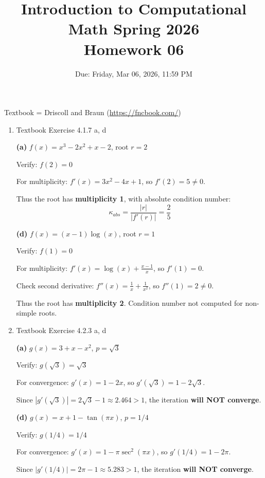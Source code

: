 \documentclass[reqno]{exam}
\title{Introduction to Computational Math Spring 2026 \\ Homework 06}
\date{Due: Friday, Mar 06, 2026, 11:59 PM}
\author{}
\begin{document}
\maketitle
\thispagestyle{empty}

Textbook = Driscoll and Braun (\url{https://fncbook.com/})

\begin{enumerate}

\item Textbook Exercise 4.1.7 a, d
\begin{solution}
\textbf{(a)} $f(x) = x^3 - 2x^2 + x - 2$, root $r = 2$

Verify: $f(2) = 0$ \checkmark

For multiplicity: $f'(x) = 3x^2 - 4x + 1$, so $f'(2) = 5 \neq 0$.

Thus the root has \textbf{multiplicity 1}, with absolute condition number:
$$\kappa_{abs} = \frac{|r|}{|f'(r)|} = \frac{2}{5}$$

\textbf{(d)} $f(x) = (x-1)\log(x)$, root $r = 1$

Verify: $f(1) = 0$ \checkmark

For multiplicity: $f'(x) = \log(x) + \frac{x-1}{x}$, so $f'(1) = 0$.

Check second derivative: $f''(x) = \frac{1}{x} + \frac{1}{x^2}$, so $f''(1) = 2 \neq 0$.

Thus the root has \textbf{multiplicity 2}. Condition number not computed for non-simple roots.
\end{solution}

\item Textbook Exercise 4.2.3 a, d
\begin{solution}
\textbf{(a)} $g(x) = 3 + x - x^2$, $p = \sqrt{3}$

Verify: $g(\sqrt{3}) = \sqrt{3}$ \checkmark

For convergence: $g'(x) = 1 - 2x$, so $g'(\sqrt{3}) = 1 - 2\sqrt{3}$.

Since $|g'(\sqrt{3})| = 2\sqrt{3} - 1 \approx 2.464 > 1$, the iteration \textbf{will NOT converge}.

\textbf{(d)} $g(x) = x + 1 - \tan(\pi x)$, $p = 1/4$

Verify: $g(1/4) = 1/4$ \checkmark

For convergence: $g'(x) = 1 - \pi \sec^2(\pi x)$, so $g'(1/4) = 1 - 2\pi$.

Since $|g'(1/4)| = 2\pi - 1 \approx 5.283 > 1$, the iteration \textbf{will NOT converge}.
\end{solution}


\end{enumerate}
\end{document}
